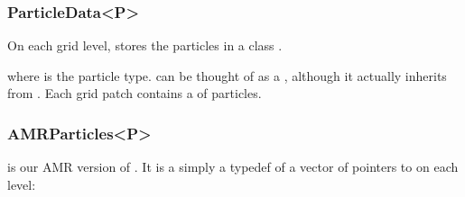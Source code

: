 \documentclass[letterpaper,10pt,english]{sphinxmanual}
\begin{document}
\subsubsection{ParticleData\textless{}P\textgreater{}}
\label{\detokenize{Source/Particles:particledata-p}}
\sphinxAtStartPar
On each grid level,  stores the particles in a  class .

\begin{sphinxVerbatim}[commandchars=\\\{\},formatcom=\scriptsize]
  
\end{sphinxVerbatim}

\sphinxAtStartPar
where  is the particle type.
 can be thought of as a , although it actually inherits from .
Each grid patch contains a  of particles.


\subsubsection{AMRParticles\textless{}P\textgreater{}}
\label{\detokenize{Source/Particles:amrparticles-p}}
\sphinxAtStartPar
{} is our AMR version of .
It is a simply a typedef of a vector of pointers to  on each level:

\begin{sphinxVerbatim}[commandchars=\\\{\},formatcom=\scriptsize]
  
     
\end{sphinxVerbatim}
\end{document}
